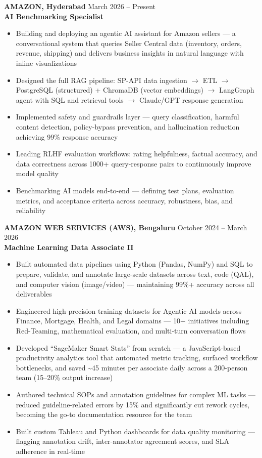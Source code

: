 \documentclass[10.5pt,a4paper]{article}
\begin{document}
{\textbf{AMAZON, Hyderabad} \hfill {\small\color{subtext} March 2026 -- Present}}\\
{\color{accent}\textbf{AI Benchmarking Specialist}}
\begin{itemize}
\item Building and deploying an agentic AI assistant for Amazon sellers --- a conversational system that queries Seller Central data (inventory, orders, revenue, shipping) and delivers business insights in natural language with inline visualizations
\item Designed the full RAG pipeline: SP-API data ingestion $\rightarrow$ ETL $\rightarrow$ PostgreSQL (structured) + ChromaDB (vector embeddings) $\rightarrow$ LangGraph agent with SQL and retrieval tools $\rightarrow$ Claude/GPT response generation
\item Implemented safety and guardrails layer --- query classification, harmful content detection, policy-bypass prevention, and hallucination reduction achieving 99\% response accuracy
\item Leading RLHF evaluation workflows: rating helpfulness, factual accuracy, and data correctness across 1000+ query-response pairs to continuously improve model quality
\item Benchmarking AI models end-to-end --- defining test plans, evaluation metrics, and acceptance criteria across accuracy, robustness, bias, and reliability
\end{itemize}

\vspace{4pt}
{\textbf{AMAZON WEB SERVICES (AWS), Bengaluru} \hfill {\small\color{subtext} October 2024 -- March 2026}}\\
{\color{accent}\textbf{Machine Learning Data Associate II}}
\begin{itemize}
\item Built automated data pipelines using Python (Pandas, NumPy) and SQL to prepare, validate, and annotate large-scale datasets across text, code (QAL), and computer vision (image/video) --- maintaining 99\%+ accuracy across all deliverables
\item Engineered high-precision training datasets for Agentic AI models across Finance, Mortgage, Health, and Legal domains --- 10+ initiatives including Red-Teaming, mathematical evaluation, and multi-turn conversation flows
\item Developed ``SageMaker Smart Stats'' from scratch --- a JavaScript-based productivity analytics tool that automated metric tracking, surfaced workflow bottlenecks, and saved \textasciitilde45 minutes per associate daily across a 200-person team (15--20\% output increase)
\item Authored technical SOPs and annotation guidelines for complex ML tasks --- reduced guideline-related errors by 15\% and significantly cut rework cycles, becoming the go-to documentation resource for the team
\item Built custom Tableau and Python dashboards for data quality monitoring --- flagging annotation drift, inter-annotator agreement scores, and SLA adherence in real-time
\end{itemize}
\end{document}

